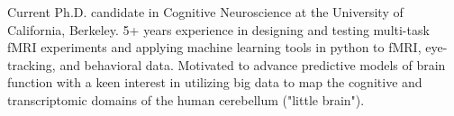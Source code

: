 

\begin{cvparagraph}

Current Ph.D. candidate in Cognitive Neuroscience at the University of California, Berkeley. 5+ years experience in designing and testing multi-task fMRI experiments and applying machine learning tools in python to fMRI, eye-tracking, and behavioral data. Motivated to advance predictive models of brain function with a keen interest in utilizing big data to map the cognitive and transcriptomic domains of the human cerebellum ("little brain").

\end{cvparagraph}
